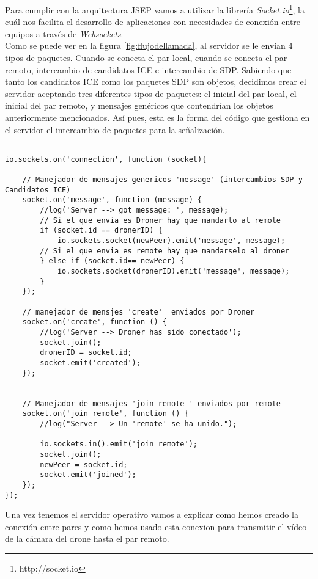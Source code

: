 Para cumplir con la arquitectura JSEP vamos a utilizar la librería \emph{Socket.io}\footnote{http://socket.io}, la cuál nos facilita el desarrollo de aplicaciones con necesidades de conexión entre equipos a través de \emph{Websockets}.\\

Como se puede ver en la figura \ref{fig:flujodellamada}, al servidor se le envían 4 tipos de paquetes. Cuando se conecta el par local, cuando se conecta el par remoto, intercambio de candidatos ICE e intercambio de SDP. Sabiendo que tanto los candidatos ICE como los paquetes SDP son objetos, decidimos crear el servidor aceptando tres diferentes tipos de paquetes: el inicial del par local, el inicial del par remoto, y mensajes genéricos que contendrían los objetos anteriormente mencionados. Así pues, esta es la forma del código que gestiona en el servidor el intercambio de paquetes para la señalización.\\

\begin{lstlisting}[caption=Núcleo servidor de señalización]

io.sockets.on('connection', function (socket){

	// Manejador de mensajes genericos 'message' (intercambios SDP y Candidatos ICE)
	socket.on('message', function (message) {
		//log('Server --> got message: ', message);
		// Si el que envia es Droner hay que mandarlo al remote
		if (socket.id == dronerID) {
			io.sockets.socket(newPeer).emit('message', message);
		// Si el que envia es remote hay que mandarselo al droner
		} else if (socket.id== newPeer) {
			io.sockets.socket(dronerID).emit('message', message);
		} 
	});

	// manejador de mensjes 'create'  enviados por Droner
	socket.on('create', function () {
		//log('Server --> Droner has sido conectado');
		socket.join();
		dronerID = socket.id;
		socket.emit('created');
	});
	

	// Manejador de mensajes 'join remote ' enviados por remote
	socket.on('join remote', function () {
		//log("Server --> Un 'remote' se ha unido.");
		
		io.sockets.in().emit('join remote');
		socket.join();
		newPeer = socket.id;
		socket.emit('joined');
	});
});
\end{lstlisting}

Una vez tenemos el servidor operativo vamos a explicar como hemos creado la conexión entre pares y como hemos usado esta conexion para transmitir el vídeo de la cámara del drone hasta el par remoto.\\

